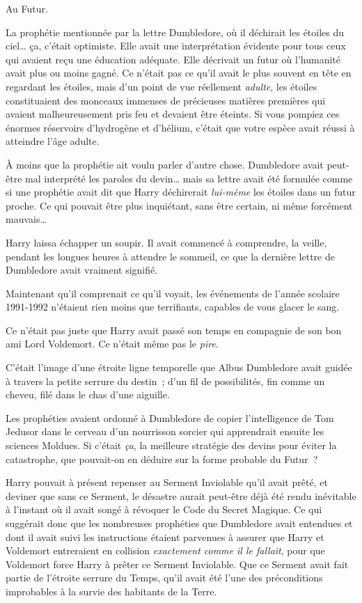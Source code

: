 Au Futur.

La prophétie mentionnée par la lettre Dumbledore, où il déchirait les étoiles du ciel… ça, c'était optimiste.
Elle avait une interprétation évidente pour tous ceux qui avaient reçu une éducation adéquate.
Elle décrivait un futur où l'humanité avait plus ou moins gagné.
Ce n'était pas ce qu'il avait le plus souvent en tête en regardant les étoiles, mais d'un point de vue réellement \emph{adulte}, les étoiles constituaient des monceaux immenses de précieuses matières premières qui avaient malheureusement pris feu et devaient être éteints.
Si vous pompiez ces énormes réservoirs d'hydrogène et d'hélium, c'était que votre espèce avait réussi à atteindre l'âge adulte.

À moins que la prophétie ait voulu parler d'autre chose.
Dumbledore avait peut-être mal interprété les paroles du devin… mais sa lettre avait été formulée comme si une prophétie avait dit que Harry déchirerait \emph{lui-même} les étoiles dans un futur proche.
Ce qui pouvait être plus inquiétant, sans être certain, ni même forcément mauvais…

Harry laissa échapper un soupir.
Il avait commencé à comprendre, la veille, pendant les longues heures à attendre le sommeil, ce que la dernière lettre de Dumbledore avait vraiment signifié.

Maintenant qu'il comprenait ce qu'il voyait, les événements de l'année scolaire 1991-1992 n'étaient rien moins que terrifiants, capables de vous glacer le sang.

Ce n'était pas juste que Harry avait passé son temps en compagnie de son bon ami Lord Voldemort.
Ce n'était même pas le \emph{pire}.

C'était l'image d'une étroite ligne temporelle que Albus Dumbledore avait guidée à travers la petite serrure du destin~; d'un fil de possibilités, fin comme un cheveu, filé dans le chas d'une aiguille.

Les prophéties avaient ordonné à Dumbledore de copier l'intelligence de Tom Jedusor dans le cerveau d'un nourrisson sorcier qui apprendrait ensuite les sciences Moldues.
Si c'était \emph{ça}, la meilleure stratégie des devins pour éviter la catastrophe, que pouvait-on en déduire sur la forme probable du Futur~?

Harry pouvait à présent repenser au Serment Inviolable qu'il avait prêté, et deviner que sans ce Serment, le désastre aurait peut-être déjà été rendu inévitable à l'instant où il avait songé à révoquer le Code du Secret Magique.
Ce qui suggérait donc que les nombreuses prophéties que Dumbledore avait entendues et dont il avait suivi les instructions étaient parvenues à assurer que Harry et Voldemort entreraient en collision \emph{exactement comme il le fallait}, pour que Voldemort force Harry à prêter ce Serment Inviolable.
Que ce Serment avait fait partie de l'étroite serrure du Temps, qu'il avait été l'une des préconditions improbables à la survie des habitants de la Terre.

